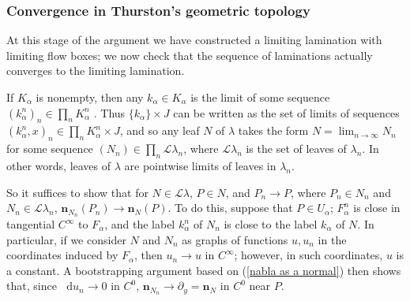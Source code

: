 \documentclass[reqno,11pt]{amsart}
\newcommand*\dif{\mathop{}\!\mathrm{d}}
\newcommand{\Leaves}{\mathscr L}
\newcommand{\normal}{\mathbf n}
\theoremstyle{definition}
\numberwithin{equation}{section}
\begin{document}
\subsubsection{Convergence in Thurston's geometric topology}
At this stage of the argument we have constructed a limiting lamination with limiting flow boxes; we now check that the sequence of laminations actually converges to the limiting lamination.

If $K_\alpha$ is nonempty, then any $k_\alpha \in K_\alpha$ is the limit of some sequence $(k_\alpha^n)_n \in \prod_n K_\alpha^n$ \cite[Theorem 4.11]{nadler2017continuum}.
Thus $\{k_\alpha\} \times J$ can be written as the set of limits of sequences $(k_\alpha^n, x)_n \in \prod_n K_\alpha^n \times J$, and so any leaf $N$ of $\lambda$ takes the form $N = \lim_{n \to \infty} N_n$ for some sequence $(N_n) \in \prod_n \Leaves \lambda_n$, where $\Leaves \lambda_n$ is the set of leaves of $\lambda_n$.
In other words, leaves of $\lambda$ are pointwise limits of leaves in $\lambda_n$.

So it suffices to show that for $N \in \Leaves \lambda$, $P \in N$, and $P_n \to P$, where $P_n \in N_n$ and $N_n \in \Leaves \lambda_n$, $\normal_{N_n}(P_n) \to \normal_N(P)$.
To do this, suppose that $P \in U_\alpha$; $F_\alpha^n$ is close in tangential $C^\infty$ to $F_\alpha$, and the label $k^n_\alpha$ of $N_n$ is close to the label $k_\alpha$ of $N$.
In particular, if we consider $N$ and $N_n$ as graphs of functions $u, u_n$ in the coordinates induced by $F_\alpha$, then $u_n \to u$ in $C^\infty$; however, in such coordinates, $u$ is a constant.
A bootstrapping argument based on (\ref{nabla as a normal}) then shows that, since $\dif u_n \to 0$ in $C^0$, $\normal_{N_n} \to \partial_y = \normal_N$ in $C^0$ near $P$.
\end{document}
